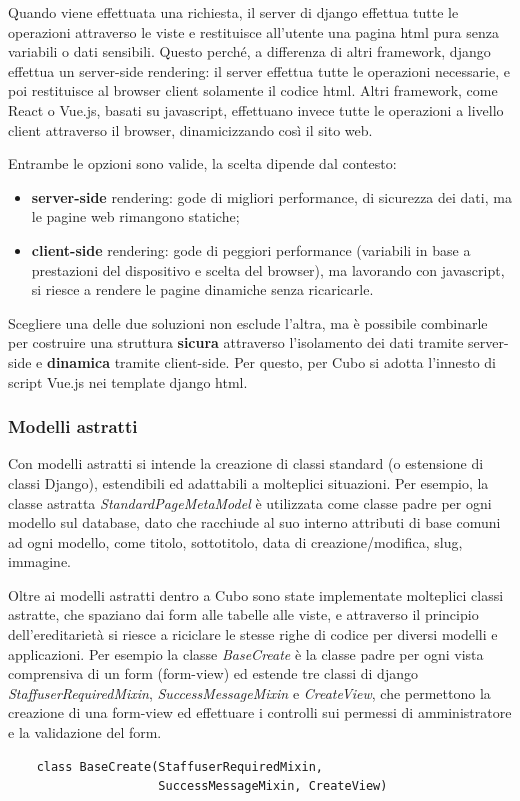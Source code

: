 \documentclass[12pt,a4paper]{article}
\begin{document}
Quando viene effettuata una richiesta, il server di django effettua tutte le operazioni attraverso le viste e restituisce all’utente una pagina html pura senza variabili o dati sensibili. Questo perché, a differenza di altri framework, django effettua un server-side rendering: il server effettua tutte le operazioni necessarie, e poi restituisce al browser client solamente il codice html.
Altri framework, come React o Vue.js, basati su javascript, effettuano invece tutte le operazioni a livello client attraverso il browser, dinamicizzando così il sito web.

Entrambe le opzioni sono valide, la scelta dipende dal contesto:
\begin{itemize}
    \item \textbf{server-side} rendering: gode di migliori performance, di sicurezza dei dati, ma le pagine web rimangono statiche;
    \item \textbf{client-side} rendering: gode di peggiori performance (variabili in base a prestazioni del dispositivo e scelta del browser), ma lavorando con javascript, si riesce a rendere le pagine dinamiche senza ricaricarle.
\end{itemize}
Scegliere una delle due soluzioni non esclude l’altra, ma è possibile combinarle per costruire una struttura \textbf{sicura} attraverso l’isolamento dei dati tramite server-side e \textbf{dinamica} tramite client-side. Per questo, per Cubo si adotta l’innesto di script Vue.js nei template django html.

\subsubsection{Modelli astratti}
Con modelli astratti si intende la creazione di classi standard (o estensione di classi Django), estendibili ed adattabili a molteplici situazioni. Per esempio, la classe astratta \textit{StandardPageMetaModel} è utilizzata come classe padre per ogni modello sul database, dato che racchiude al suo interno attributi di base comuni ad ogni modello, come titolo, sottotitolo, data di creazione/modifica, slug, immagine.

Oltre ai modelli astratti dentro a Cubo sono state implementate molteplici classi astratte, che spaziano dai form alle tabelle alle viste, e attraverso il principio dell'ereditarietà si riesce a riciclare le stesse righe di codice per diversi modelli e applicazioni. Per esempio la classe \textit{BaseCreate} è la classe padre per ogni vista comprensiva di un form (form-view) ed estende tre classi di django \textit{StaffuserRequiredMixin}, \textit{SuccessMessageMixin} e \textit{CreateView}, che permettono la creazione di una form-view ed effettuare i controlli sui permessi di amministratore e la validazione del form.
\begin{verbatim}
    class BaseCreate(StaffuserRequiredMixin,
                     SuccessMessageMixin, CreateView)
\end{verbatim}
\end{document}
